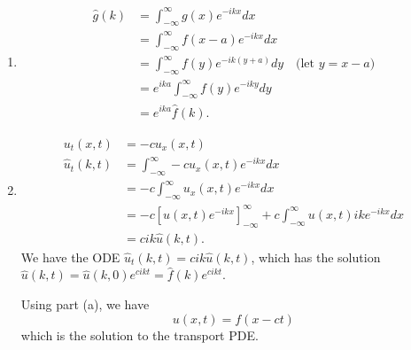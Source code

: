 \documentclass[plain]{pset}
\begin{document}
\begin{solution}
    \[\]
    \vspace*{-4em}
    \begin{enumerate}[label = (\alph*)]
        \item
              \begin{align*}
                  \hat{g}(k) & = \int_{-\infty}^{\infty} g(x)e^{-ikx}dx                                        \\
                             & = \int_{-\infty}^{\infty} f(x - a)e^{-ikx}dx                                    \\
                             & = \int_{-\infty}^{\infty} f(y)e^{-ik(y + a)}dy \quad \text{(let \(y = x - a\))} \\
                             & = e^{ika}\int_{-\infty}^{\infty} f(y)e^{-iky}dy                                 \\
                             & = e^{ika}\hat{f}(k).
              \end{align*}
        \item \begin{align*}
                  u_t(x, t)       & = -cu_x(x, t)                                                                                           \\
                  \hat{u}_t(k, t) & = \int_{-\infty}^{\infty} -cu_x(x, t)e^{-ikx}dx                                                         \\
                                  & = -c\int_{-\infty}^{\infty} u_x(x, t)e^{-ikx}dx                                                         \\
                                  & = -c{\left[ u(x, t)e^{-ikx} \right]}_{-\infty}^{\infty} + c\int_{-\infty}^{\infty} u(x, t)ik e^{-ikx}dx \\
                                  & = cik\hat{u}(k, t).
              \end{align*}
              We have the ODE \(\hat{u}_t(k, t) = cik\hat{u}(k, t)\), which has the solution \(\hat{u}(k, t) = \hat{u}(k, 0)e^{cikt} = \hat{f}(k)e^{cikt}\).

              Using part (a), we have
              \[u(x, t) = f(x - ct)\]
              which is the solution to the transport PDE\@.
    \end{enumerate}
\end{solution}

\pagebreak
\end{document}
